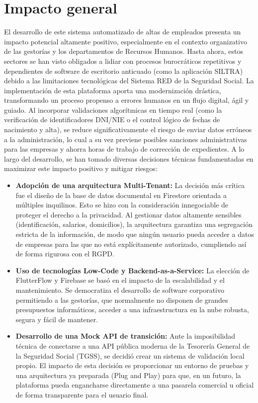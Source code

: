 \section{Impacto general} \label{sct:impacto:general}
El desarrollo de este sistema automatizado de altas de empleados presenta un impacto potencial altamente positivo, especialmente en el contexto organizativo de las gestorías y los departamentos de Recursos Humanos. Hasta ahora, estos sectores se han visto obligados a lidiar con procesos burocráticos repetitivos y dependientes de software de escritorio anticuado (como la aplicación SILTRA) debido a las limitaciones tecnológicas del Sistema RED de la Seguridad Social.
La implementación de esta plataforma aporta una modernización drástica, transformando un proceso propenso a errores humanos en un flujo digital, ágil y guiado. Al incorporar validaciones algorítmicas en tiempo real (como la verificación de identificadores DNI/NIE o el control lógico de fechas de nacimiento y alta), se reduce significativamente el riesgo de enviar datos erróneos a la administración, lo cual a su vez previene posibles sanciones administrativas para las empresas y ahorra horas de trabajo de corrección de expedientes.
A lo largo del desarrollo, se han tomado diversas decisiones técnicas fundamentadas en maximizar este impacto positivo y mitigar riesgos:
\begin{itemize} \item \textbf{Adopción de una arquitectura Multi-Tenant:} La decisión más crítica fue el diseño de la base de datos documental en Firestore orientada a múltiples inquilinos. Esto se hizo con la consideración innegociable de proteger el derecho a la privacidad. Al gestionar datos altamente sensibles (identificación, salarios, domicilios), la arquitectura garantiza una segregación estricta de la información, de modo que ningún usuario pueda acceder a datos de empresas para las que no está explícitamente autorizado, cumpliendo así de forma rigurosa con el RGPD. \item \textbf{Uso de tecnologías Low-Code y Backend-as-a-Service:} La elección de FlutterFlow y Firebase se basó en el impacto de la escalabilidad y el mantenimiento. Se democratiza el desarrollo de software corporativo permitiendo a las gestorías, que normalmente no disponen de grandes presupuestos informáticos, acceder a una infraestructura en la nube robusta, segura y fácil de mantener. \item \textbf{Desarrollo de una Mock API de transición:} Ante la imposibilidad técnica de conectarse a una API pública moderna de la Tesorería General de la Seguridad Social (TGSS), se decidió crear un sistema de validación local propio. El impacto de esta decisión es proporcionar un entorno de pruebas y una arquitectura ya preparada (Plug and Play) para que, en un futuro, la plataforma pueda engancharse directamente a una pasarela comercial u oficial de forma transparente para el usuario final. \end{itemize}
